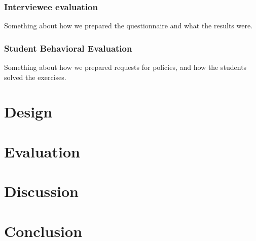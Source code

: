 \documentclass{llncs}
\begin{document}
\subsubsection{Interviewee evaluation}\label{subsec:interviewee-evaluation}
Something about how we prepared the questionnaire and what the results were.

\subsubsection{Student Behavioral Evaluation}\label{subsec:student-evaluation}
Something about how we prepared requests for policies, and how the students solved the exercises.

\section{Design}\label{sec:design}

\section{Evaluation}\label{sec:evaluation}

\section{Discussion}\label{sec:discussion}

\section{Conclusion}\label{sec:conclusion}

{}

\end{document}
